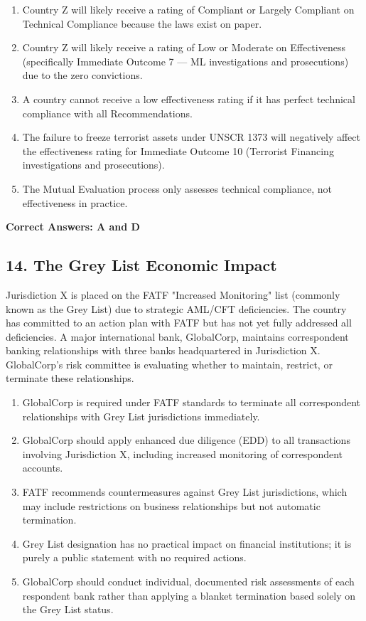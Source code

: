 \documentclass[11pt,a4paper]{article}
\begin{document}
	\begin{enumerate}[label=\Alph*.]
		\item Country Z will likely receive a rating of Compliant or Largely Compliant on Technical Compliance because the laws exist on paper.
		\item Country Z will likely receive a rating of Low or Moderate on Effectiveness (specifically Immediate Outcome 7 — ML investigations and prosecutions) due to the zero convictions.
		\item A country cannot receive a low effectiveness rating if it has perfect technical compliance with all Recommendations.
		\item The failure to freeze terrorist assets under UNSCR 1373 will negatively affect the effectiveness rating for Immediate Outcome 10 (Terrorist Financing investigations and prosecutions).
		\item The Mutual Evaluation process only assesses technical compliance, not effectiveness in practice.
	\end{enumerate}
	
	\textbf{Correct Answers: A and D}
	
	\subsection{14. The Grey List Economic Impact}
	
	Jurisdiction X is placed on the FATF "Increased Monitoring" list (commonly known as the Grey List) due to strategic AML/CFT deficiencies. The country has committed to an action plan with FATF but has not yet fully addressed all deficiencies. A major international bank, GlobalCorp, maintains correspondent banking relationships with three banks headquartered in Jurisdiction X. GlobalCorp's risk committee is evaluating whether to maintain, restrict, or terminate these relationships.
	
	\begin{enumerate}[label=\Alph*.]
		\item GlobalCorp is required under FATF standards to terminate all correspondent relationships with Grey List jurisdictions immediately.
		\item GlobalCorp should apply enhanced due diligence (EDD) to all transactions involving Jurisdiction X, including increased monitoring of correspondent accounts.
		\item FATF recommends countermeasures against Grey List jurisdictions, which may include restrictions on business relationships but not automatic termination.
		\item Grey List designation has no practical impact on financial institutions; it is purely a public statement with no required actions.
		\item GlobalCorp should conduct individual, documented risk assessments of each respondent bank rather than applying a blanket termination based solely on the Grey List status.
	\end{enumerate}
	
\end{document}
